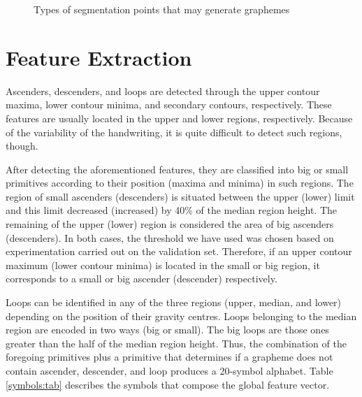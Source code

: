 \documentclass{article}[14pt, oneside, a4paper, times]
\begin{document}
\begin{figure}[htbp]
   \centering
   \caption{Types of segmentation points that may generate graphemes \cite{Marisa03}}
   \label{segpoints:fig}
\end{figure}

\section{Feature Extraction}

Ascenders, descenders, and loops are detected through the upper contour maxima, lower contour minima, and secondary contours, respectively. These features are usually located in the upper and lower regions, respectively. Because of the variability of the handwriting, it is quite difficult to detect such regions, though. 

After detecting the aforementioned features, they are classified into big or small primitives according to their position (maxima and minima) in such regions. The region of small ascenders (descenders) is situated between the upper (lower) limit and this limit decreased (increased) by 40\% of the median region height. The remaining of the upper (lower) region is considered the area of big ascenders (descenders). In both cases, the threshold we have used was chosen based on experimentation carried out on the validation set. Therefore, if an upper contour maximum (lower contour minima) is located in the small or big region, it corresponds to a small or big ascender (descender) respectively.

Loops can be identified in any of the three regions (upper, median, and lower) depending on the position of their gravity centres. Loops belonging to the median region are encoded in two ways (big or small). The big loops are those ones greater than the half of the median region height. Thus, the combination of the foregoing primitives plus a primitive that determines if a grapheme does not contain ascender, descender, and loop produces a 20-symbol alphabet. Table \ref{symbols:tab} describes the symbols that compose the global feature vector.
\end{document}

